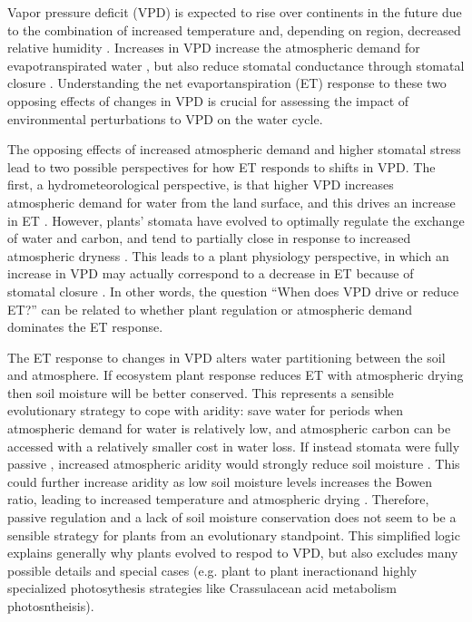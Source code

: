 Vapor pressure deficit (VPD) is expected to rise over continents in
the future due to the combination of increased temperature and,
depending on region, decreased relative humidity
\citep{Byrne_2013}. Increases in VPD increase the atmospheric demand
for evapotranspirated water \citep{Penman_1948, Monteith_1965}, but
also reduce stomatal conductance through stomatal closure
\citep{Rawson1977, Leuning_1990, Mott2007,
Darmour2010, MEDLYN_2011}. Understanding the net evaportanspiration (ET) response
to these two opposing effects of changes in VPD is crucial for
assessing the impact of environmental perturbations to VPD on the
water cycle.

The opposing effects of increased atmospheric demand and higher
stomatal stress lead to two possible perspectives for how ET responds
to shifts in VPD. The first, a hydrometeorological perspective, is
that higher VPD increases atmospheric demand for water from the land
surface, and this drives an increase in ET
\citep{Penman_1948}. However, plants' stomata have evolved to
optimally regulate the exchange of water and carbon, and tend to
partially close in response to increased atmospheric dryness
\citep{Farquhar_1978, Ball_1987, Leuning_1990, Katul_2009, MEDLYN_2011}. This
leads to a plant physiology perspective, in which an increase in VPD
may actually correspond to a decrease in ET because of stomatal
closure \citep[e.g.][]{Rigden_2017}.  In other words, the question
``When does VPD drive or reduce ET?'' can be related to whether plant
regulation or atmospheric demand dominates the ET response.

The ET response to changes in VPD alters water partitioning between
the soil and atmosphere. If ecosystem plant response reduces ET with
atmospheric drying then soil moisture will be better conserved. This
represents a sensible evolutionary strategy to cope with aridity: save
water for periods when atmospheric demand for water is relatively low,
and atmospheric carbon can be accessed with a relatively smaller cost
in water loss. If instead stomata were fully passive \citep [similar
to soil pores, e.g. ][]{Or_2013}, increased atmospheric aridity would
strongly reduce soil moisture \citep{Berg_2017}. This could further
increase aridity as low soil moisture levels increases the Bowen
ratio, leading to increased temperature and atmospheric drying
\citep[][]{Bouchet_1963, Morton_1965, Brutsaert_1999, Ozdogan_2006,
Salvucci_2013, Gentine_2016, Berg_2016, Zhou_2019}. Therefore, passive
regulation and a lack of soil moisture conservation does not seem to
be a sensible strategy for plants from an evolutionary
standpoint. This simplified logic explains generally why plants
evolved to respod to VPD, but also excludes many possible details and
special cases (e.g. plant to plant ineractionand highly specialized
photosythesis strategies like Crassulacean acid metabolism
photosntheisis).

